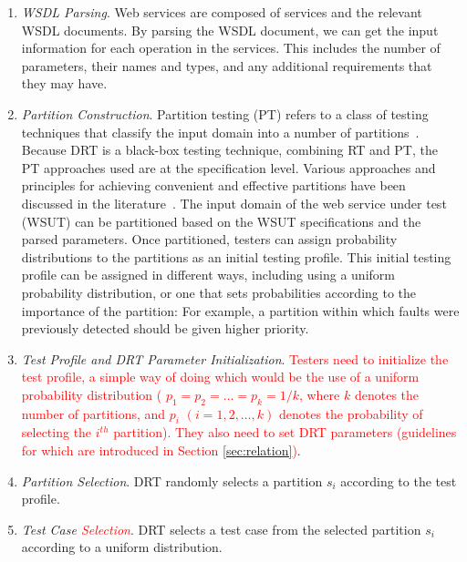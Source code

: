 \documentclass[10pt,journal,compsoc]{IEEEtran}
\begin{document}
\begin{enumerate}[1)]
  \item
  \emph{WSDL Parsing}.
  Web services are composed of services and the relevant WSDL documents.
  By parsing the WSDL document, we can get the input information for each operation in the services.
  This includes the number of parameters, their names and types, and any additional requirements that they may have.

  \item
  \emph{Partition Construction}.
  Partition testing (PT) refers to a class of testing techniques that classify the input domain into a number of partitions~\cite{weyuker1991analyzing}.
  Because DRT is a black-box testing technique, combining RT and PT, the PT approaches used are at the specification level.
  Various approaches and principles for achieving convenient and effective partitions have been discussed in the literature~\cite{weyuker1991analyzing, cai2005partition, chen1994relationship, chen1996expected}.
  The input domain of the web service under test (WSUT) can be partitioned based on the WSUT specifications and the parsed parameters.
  Once partitioned, testers can assign probability distributions to the partitions as an initial testing profile.
  This initial testing profile can be assigned in different ways, including using a uniform probability distribution, or one that sets probabilities according to the importance of the partition:
  For example, a partition within which faults were previously detected should be given higher priority.

  \item
  \emph{Test Profile and DRT Parameter Initialization}.
  \textcolor{red}{Testers need to initialize the test profile, a simple way of doing which would be the use of a uniform probability distribution ( $p_1 = p_2 = \ldots = p_k = 1 / k$, where $k$ denotes the number of partitions, and $p_i$ $(i = 1,2, \ldots, k)$ denotes the probability of selecting the $i^{th}$ partition). They also need to set DRT parameters (guidelines for which are introduced in Section \ref{sec:relation})}.

  \item
  \emph{Partition Selection}.
  DRT randomly selects a partition $s_i$ according to the test profile.

  \item
  \emph{Test Case \textcolor{red}{Selection}}.
  DRT selects a test case from the selected partition $s_i$ according to a uniform distribution.


\end{enumerate}
\end{document}
